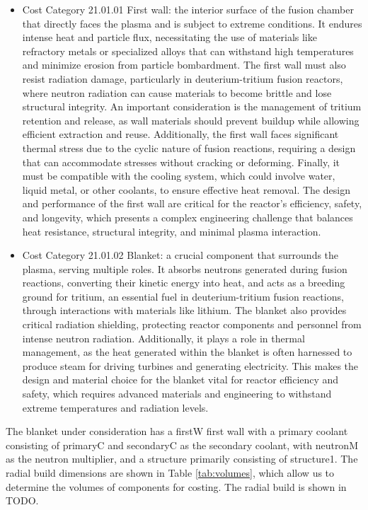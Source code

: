 \begin{itemize}
    \item Cost Category 21.01.01 First wall: the interior surface of the fusion chamber that directly faces the plasma and is subject to extreme conditions. It endures intense heat and particle flux, necessitating the use of materials like refractory metals or specialized alloys that can withstand high temperatures and minimize erosion from particle bombardment. The first wall must also resist radiation damage, particularly in deuterium-tritium fusion reactors, where neutron radiation can cause materials to become brittle and lose structural integrity. An important consideration is the management of tritium retention and release, as wall materials should prevent buildup while allowing efficient extraction and reuse. Additionally, the first wall faces significant thermal stress due to the cyclic nature of fusion reactions, requiring a design that can accommodate stresses without cracking or deforming. Finally, it must be compatible with the cooling system, which could involve water, liquid metal, or other coolants, to ensure effective heat removal. The design and performance of the first wall are critical for the reactor's efficiency, safety, and longevity, which presents a complex engineering challenge that balances heat resistance, structural integrity, and minimal plasma interaction.
    \item Cost Category 21.01.02 Blanket: a crucial component that surrounds the plasma, serving multiple roles. It absorbs neutrons generated during fusion reactions, converting their kinetic energy into heat, and acts as a breeding ground for tritium, an essential fuel in deuterium-tritium fusion reactions, through interactions with materials like lithium. The blanket also provides critical radiation shielding, protecting reactor components and personnel from intense neutron radiation. Additionally, it plays a role in thermal management, as the heat generated within the blanket is often harnessed to produce steam for driving turbines and generating electricity. This makes the design and material choice for the blanket vital for reactor efficiency and safety, which requires advanced materials and engineering to withstand extreme temperatures and radiation levels.
\end{itemize}

The blanket under consideration has a firstW first wall with a primary coolant consisting of primaryC and secondaryC as the secondary coolant, with neutronM as the neutron multiplier, and a structure primarily consisting of structure1. The radial build dimensions are shown in Table \ref{tab:volumes}, which allow us to determine the volumes of components for costing.  The radial build is shown in TODO. \\


